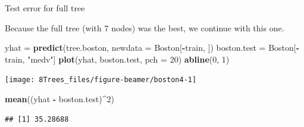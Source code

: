 \documentclass[10pt,ignorenonframetext,]{beamer}
\newenvironment{Shaded}{\begin{snugshade}}{\end{snugshade}}
\newcommand{\KeywordTok}[1]{\textcolor[rgb]{0.13,0.29,0.53}{\textbf{#1}}}
\newcommand{\DataTypeTok}[1]{\textcolor[rgb]{0.13,0.29,0.53}{#1}}
\newcommand{\DecValTok}[1]{\textcolor[rgb]{0.00,0.00,0.81}{#1}}
\newcommand{\StringTok}[1]{\textcolor[rgb]{0.31,0.60,0.02}{#1}}
\newcommand{\OperatorTok}[1]{\textcolor[rgb]{0.81,0.36,0.00}{\textbf{#1}}}
\newcommand{\NormalTok}[1]{#1}
\begin{document}
\begin{frame}[fragile]

\begin{block}{Test error for full tree}

\vspace{1mm}

Because the full tree (with 7 nodes) was the best, we continue with this
one.

\scriptsize

\begin{Shaded}
\begin{Highlighting}[]
\NormalTok{yhat =}\StringTok{ }\KeywordTok{predict}\NormalTok{(tree.boston, }\DataTypeTok{newdata =}\NormalTok{ Boston[}\OperatorTok{-}\NormalTok{train, ])}
\NormalTok{boston.test =}\StringTok{ }\NormalTok{Boston[}\OperatorTok{-}\NormalTok{train, }\StringTok{"medv"}\NormalTok{]}
\KeywordTok{plot}\NormalTok{(yhat, boston.test, }\DataTypeTok{pch =} \DecValTok{20}\NormalTok{)}
\KeywordTok{abline}\NormalTok{(}\DecValTok{0}\NormalTok{, }\DecValTok{1}\NormalTok{)}
\end{Highlighting}
\end{Shaded}

\begin{center}\texttt{[image: 8Trees\_files/figure-beamer/boston4-1]} \end{center}

\begin{Shaded}
\begin{Highlighting}[]
\KeywordTok{mean}\NormalTok{((yhat }\OperatorTok{-}\StringTok{ }\NormalTok{boston.test)}\OperatorTok{^}\DecValTok{2}\NormalTok{)}
\end{Highlighting}
\end{Shaded}

\begin{verbatim}
## [1] 35.28688
\end{verbatim}

\end{block}

\end{frame}
\end{document}
